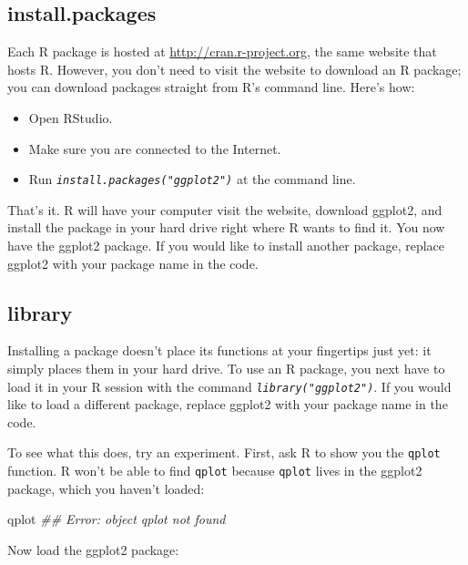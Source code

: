 \documentclass[
  letterpaper,
  DIV=11,
  numbers=noendperiod]{scrbook}
\newenvironment{Shaded}{\begin{snugshade}}{\end{snugshade}}
\newcommand{\DocumentationTok}[1]{\textcolor[rgb]{0.37,0.37,0.37}{\textit{#1}}}
\newcommand{\NormalTok}[1]{\textcolor[rgb]{0.00,0.23,0.31}{#1}}
\providecommand{\tightlist}{%
  \setlength{\itemsep}{0pt}\setlength{\parskip}{0pt}}
\begin{document}
\subsection{install.packages}\label{install.packages}

Each R package is hosted at \url{http://cran.r-project.org}, the same
website that hosts R. However, you don't need to visit the website to
download an R package; you can download packages straight from R's
command line. Here's how:

\begin{itemize}
\tightlist
\item
  Open RStudio.
\item
  Make sure you are connected to the Internet.
\item
  Run \emph{\texttt{install.packages("ggplot2")}} at the command line.
\end{itemize}

That's it. R will have your computer visit the website, download
ggplot2, and install the package in your hard drive right where R wants
to find it. You now have the ggplot2 package. If you would like to
install another package, replace ggplot2 with your package name in the
code.

\subsection{library}\label{library}

Installing a package doesn't place its functions at your fingertips just
yet: it simply places them in your hard drive. To use an R package, you
next have to load it in your R session with the command
\emph{\texttt{library("ggplot2")}}. If you would like to load a
different package, replace ggplot2 with your package name in the code.

To see what this does, try an experiment. First, ask R to show you the
\texttt{qplot} function. R won't be able to find \texttt{qplot} because
\texttt{qplot} lives in the ggplot2 package, which you haven't loaded:

\begin{Shaded}
\begin{Highlighting}[]
\NormalTok{qplot}
\DocumentationTok{\#\# Error: object \textquotesingle{}qplot\textquotesingle{} not found}
\end{Highlighting}
\end{Shaded}

Now load the ggplot2 package:
\end{document}
